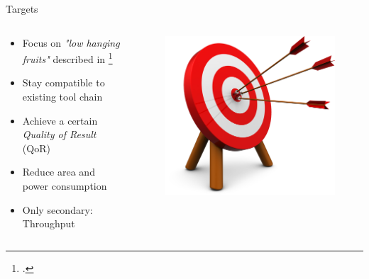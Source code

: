 \documentclass{beamer}
\begin{document}
\begin{frame}{Targets}
\begin {columns}
 \begin{column}{0.7\textwidth}
 
    \begin{itemize}
        \item<1->Focus on \textit{"low hanging fruits"} described in \footcite{Mittal:2016:STA:2891449.2893356}
        \item<2->Stay compatible to existing tool chain
        \item<3->Achieve a certain \textit{Quality of Result} (QoR)
        \item<4->Reduce area and power consumption
        \item<5->Only secondary: Throughput
    \end{itemize}
    
 \end{column}
  \begin{column}{0.3\textwidth}
    \begin{figure}
     \includegraphics[width=\textwidth]{img/target.png}
    \end{figure}
  \end{column}
\end {columns}
\end{frame}
\end{document}
